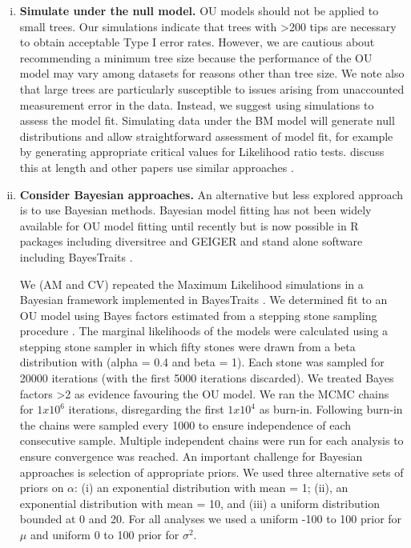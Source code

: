 \documentclass[a4paper,12pt]{article}
\begin{document}
    \begin{enumerate}[(i)]
      \item \textbf{Simulate under the null model.}
      OU models should not be applied to small trees. 
      Our simulations indicate that trees with \textgreater 200 tips are necessary to obtain acceptable Type I error rates. 
      However, we are cautious about recommending a minimum tree size because the performance of the OU model may vary among datasets for reasons other than tree size. 
      We note also that large trees are particularly susceptible to issues arising from unaccounted measurement error in the data. 
      Instead, we suggest using simulations to assess the model fit. 
      Simulating data under the BM model will generate null distributions \citep[e.g.,][]{boettiger2012your} and allow straightforward assessment of model fit, for example by generating appropriate critical values for Likelihood ratio tests. 
      \citet{boettiger2012your} discuss this at length and other papers use similar approaches \citep[e.g.,][]{freckleton2002phylogenetic, martins1991phylogenetic}.
    
      \item \textbf{Consider Bayesian approaches.}
      An alternative but less explored approach is to use Bayesian methods. 
      Bayesian model fitting has not been widely available for OU model fitting until recently but is now possible in R packages including diversitree \citep{FitzJohn:2012aa} and GEIGER \citep[the Single Stationary Peak model in \texttt{fitContinuousMCMC};][]{Harmon:2008aa} and stand alone software including BayesTraits \citep{pagel2013bayestraits}.
	
	    We (AM and CV) repeated the Maximum Likelihood simulations in a Bayesian framework implemented in BayesTraits \citep{pagel2013bayestraits}. 
      We determined fit to an OU model using Bayes factors estimated from a stepping stone sampling procedure \citep{xie2010improving}. 
      The marginal likelihoods of the models were calculated using a stepping stone sampler in which fifty stones were drawn from a beta distribution with (alpha = 0.4 and beta = 1). 
      Each stone was sampled for 20000 iterations (with the first 5000 iterations discarded). 
      We treated Bayes factors \textgreater 2 as evidence favouring the OU model. We ran the MCMC chains for $1x10^6$ iterations, disregarding the first $1x10^4$ as burn-in.
      Following burn-in the chains were sampled every 1000 to ensure independence of each consecutive sample. 
      Multiple independent chains were run for each analysis to ensure convergence was reached. 
      An important challenge for Bayesian approaches is selection of appropriate priors. We used three alternative sets of priors on $\alpha$: (i) an exponential distribution with mean = 1; (ii), an exponential distribution with mean = 10, and (iii) a uniform distribution bounded at 0 and 20. 
      For all analyses we used a uniform -100 to 100 prior for $\mu$ and uniform 0 to 100 prior for $\sigma^2$. 
      

\end{enumerate}
\end{document}
